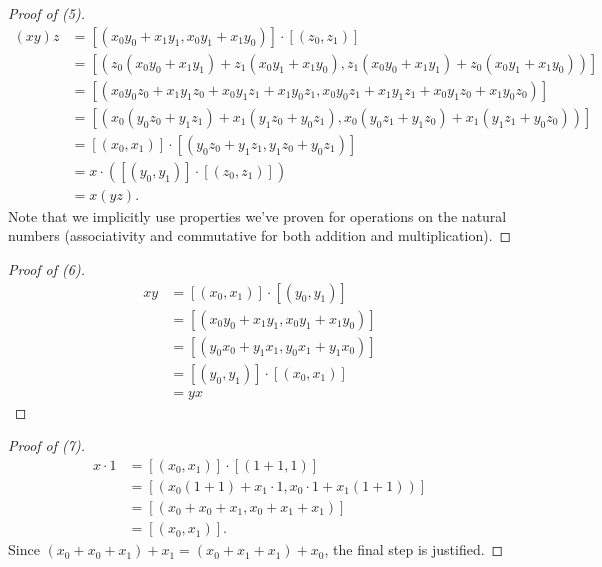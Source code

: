 \begin{proof}[Proof of (5)]
    \begin{align*}
        (xy)z &= [(x_0y_0+x_1y_1, x_0y_1+x_1y_0)] \cdot [(z_0, z_1)] \\
        &= [(z_0(x_0y_0+x_1y_1) + z_1(x_0y_1 + x_1y_0), z_1(x_0y_0 + x_1y_1) + z_0(x_0y_1+x_1y_0))]\\
        &= [(x_0y_0z_0 + x_1y_1z_0 + x_0y_1z_1 + x_1y_0z_1, x_0y_0z_1 + x_1y_1z_1 + x_0y_1z_0 + x_1y_0z_0)]\\
        &= [(x_0(y_0z_0 + y_1z_1) + x_1(y_1z_0 + y_0z_1), x_0(y_0z_1 + y_1z_0) + x_1(y_1z_1 + y_0z_0))]\\
        &= [(x_0, x_1)] \cdot [(y_0z_0 + y_1z_1, y_1z_0 + y_0z_1)]\\
        &= x \cdot ([(y_0, y_1)] \cdot [(z_0, z_1)])\\
        &= x(yz).
    \end{align*}
    Note that we implicitly use properties we've proven for operations on the natural numbers (associativity and commutative for both addition and multiplication).
\end{proof}
\begin{proof}[Proof of (6)]
    \begin{align*}
        xy &= [(x_0, x_1)] \cdot [(y_0, y_1)]\\
        &= [(x_0y_0 + x_1 y_1 , x_0y_1 + x_1 y_0)]\\
        &= [(y_0x_0 + y_1 x_1, y_0x_1 + y_1x_0)]\\
        &= [(y_0, y_1)] \cdot [(x_0, x_1)]\\
        &= yx
    \end{align*}
\end{proof}
\begin{proof}[Proof of (7)]
    \begin{align*}
        x \cdot 1 &= [(x_0, x_1)] \cdot [(1+1, 1)]\\
        &= [(x_0(1+1) + x_1 \cdot 1, x_0 \cdot 1 + x_1(1+1))] \\
        &= [(x_0 + x_0 + x_1, x_0 + x_1 + x_1)] \\
        &= [(x_0, x_1)].
    \end{align*}
    Since \((x_0+x_0+x_1) + x_1 = (x_0 +x_1 + x_1)+x_0\), the final step is justified.
\end{proof}
